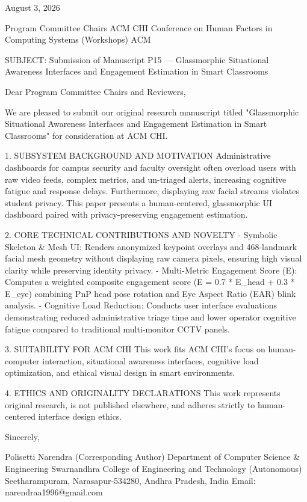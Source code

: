 August 3, 2026

Program Committee Chairs
ACM CHI Conference on Human Factors in Computing Systems (Workshops)
ACM

SUBJECT: Submission of Manuscript P15 — Glassmorphic Situational Awareness Interfaces and Engagement Estimation in Smart Classrooms

Dear Program Committee Chairs and Reviewers,

We are pleased to submit our original research manuscript titled "Glassmorphic Situational Awareness Interfaces and Engagement Estimation in Smart Classrooms" for consideration at ACM CHI.

1. SUBSYSTEM BACKGROUND AND MOTIVATION
Administrative dashboards for campus security and faculty oversight often overload users with raw video feeds, complex metrics, and un-triaged alerts, increasing cognitive fatigue and response delays. Furthermore, displaying raw facial streams violates student privacy. This paper presents a human-centered, glassmorphic UI dashboard paired with privacy-preserving engagement estimation.

2. CORE TECHNICAL CONTRIBUTIONS AND NOVELTY
  - Symbolic Skeleton & Mesh UI: Renders anonymized keypoint overlays and 468-landmark facial mesh geometry without displaying raw camera pixels, ensuring high visual clarity while preserving identity privacy.
  - Multi-Metric Engagement Score (E): Computes a weighted composite engagement score (E = 0.7 * E_head + 0.3 * E_eye) combining PnP head pose rotation and Eye Aspect Ratio (EAR) blink analysis.
  - Cognitive Load Reduction: Conducts user interface evaluations demonstrating reduced administrative triage time and lower operator cognitive fatigue compared to traditional multi-monitor CCTV panels.

3. SUITABILITY FOR ACM CHI
This work fits ACM CHI's focus on human-computer interaction, situational awareness interfaces, cognitive load optimization, and ethical visual design in smart environments.

4. ETHICS AND ORIGINALITY DECLARATIONS
This work represents original research, is not published elsewhere, and adheres strictly to human-centered interface design ethics.

Sincerely,

Polisetti Narendra (Corresponding Author)
Department of Computer Science & Engineering
Swarnandhra College of Engineering and Technology (Autonomous)
Seetharampuram, Narasapur-534280, Andhra Pradesh, India
Email: narendraa1996@gmail.com
